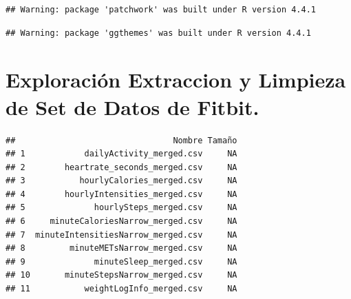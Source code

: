 \documentclass[
]{article}
\newenvironment{Shaded}{\begin{snugshade}}{\end{snugshade}}
\newcommand{\AttributeTok}[1]{\textcolor[rgb]{0.13,0.29,0.53}{#1}}
\newcommand{\CommentTok}[1]{\textcolor[rgb]{0.56,0.35,0.01}{\textit{#1}}}
\newcommand{\FunctionTok}[1]{\textcolor[rgb]{0.13,0.29,0.53}{\textbf{#1}}}
\newcommand{\NormalTok}[1]{#1}
\newcommand{\OtherTok}[1]{\textcolor[rgb]{0.56,0.35,0.01}{#1}}
\newcommand{\SpecialCharTok}[1]{\textcolor[rgb]{0.81,0.36,0.00}{\textbf{#1}}}
\newcommand{\StringTok}[1]{\textcolor[rgb]{0.31,0.60,0.02}{#1}}
\begin{document}
\begin{verbatim}
## Warning: package 'patchwork' was built under R version 4.4.1
\end{verbatim}

\begin{verbatim}
## Warning: package 'ggthemes' was built under R version 4.4.1
\end{verbatim}

\section{Exploración Extraccion y Limpieza de Set de Datos de
Fitbit.}\label{exploraciuxf3n-extraccion-y-limpieza-de-set-de-datos-de-fitbit.}

\begin{Shaded}
\end{Shaded}

\begin{verbatim}
##                                Nombre Tamaño
## 1            dailyActivity_merged.csv     NA
## 2        heartrate_seconds_merged.csv     NA
## 3           hourlyCalories_merged.csv     NA
## 4        hourlyIntensities_merged.csv     NA
## 5              hourlySteps_merged.csv     NA
## 6     minuteCaloriesNarrow_merged.csv     NA
## 7  minuteIntensitiesNarrow_merged.csv     NA
## 8         minuteMETsNarrow_merged.csv     NA
## 9              minuteSleep_merged.csv     NA
## 10       minuteStepsNarrow_merged.csv     NA
## 11           weightLogInfo_merged.csv     NA
\end{verbatim}
\end{document}
